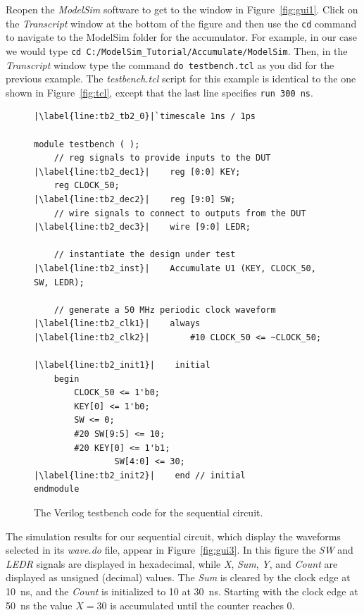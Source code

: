\documentclass[11pt, twoside, pdftex]{article}
\begin{document}
\noindent
Reopen the {\it ModelSim} software to get to the window in Figure~\ref{fig:gui1}.
Click on the {\it Transcript} window at the bottom of the figure and then use the
\texttt{cd} command to navigate to the ModelSim folder for the accumulator. For 
example, in our case we would type 
\texttt{cd C:/ModelSim\_Tutorial/Accumulate/ModelSim}. 
Then, in the {\it Transcript} window type the command \texttt{do testbench.tcl} as you
did for the previous example. The {\it testbench.tcl} script for this example is identical
to the one shown in Figure~\ref{fig:tcl}, except that the last line specifies
\texttt{run 300 ns}.

\lstset{language=Verilog,numbers=left,escapechar=|}
\begin{figure}[h]
\begin{center}
\begin{minipage}[t]{12.5 cm}
\begin{lstlisting}[name=testbench2]
|\label{line:tb2_tb2_0}|`timescale 1ns / 1ps

module testbench ( );
    // reg signals to provide inputs to the DUT
|\label{line:tb2_dec1}|    reg [0:0] KEY;
    reg CLOCK_50;
|\label{line:tb2_dec2}|    reg [9:0] SW;
    // wire signals to connect to outputs from the DUT
|\label{line:tb2_dec3}|    wire [9:0] LEDR;

    // instantiate the design under test
|\label{line:tb2_inst}|    Accumulate U1 (KEY, CLOCK_50, SW, LEDR);

    // generate a 50 MHz periodic clock waveform
|\label{line:tb2_clk1}|    always
|\label{line:tb2_clk2}|        #10 CLOCK_50 <= ~CLOCK_50;

|\label{line:tb2_init1}|    initial
    begin
        CLOCK_50 <= 1'b0;
        KEY[0] <= 1'b0;
        SW <= 0;
        #20 SW[9:5] <= 10;
        #20	KEY[0] <= 1'b1;
        		SW[4:0] <= 30;
|\label{line:tb2_init2}|    end // initial
endmodule
\end{lstlisting}
\end{minipage}
\caption{The Verilog testbench code for the sequential circuit.}
\label{fig:tb2}
\end{center}
\end{figure}

\noindent
The simulation results for our sequential circuit, which display the waveforms selected in its
{\it wave.do} file, appear in Figure~\ref{fig:gui3}. In this figure the {\it SW} and 
{\it LEDR} signals are displayed in hexadecimal, while {\it X}, {\it Sum}, {\it Y}, and {\it
Count} are displayed as unsigned (decimal) values. The {\it Sum} is cleared by the 
clock edge at 10~ns, and the {\it Count} is initialized to 10 at 30~ns. Starting with the clock
edge at 50~ns the value $X=30$ is accumulated until the counter reaches 0.
\end{document}
